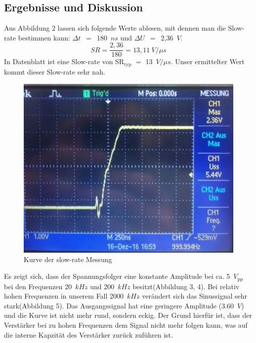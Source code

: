\subsection{Ergebnisse und Diskussion}
Aus Abbildung 2 lassen sich folgende Werte ablesen, mit dennen man die Slow-rate bestimmen kann: $\Delta t$~$=$~180~$ns$ und $\Delta U$~$=$~2,36~$V$. 
\begin{equation*}
SR = \frac{2,36}{180} = 13,11~V/\mu s
\end{equation*}
In Datenblatt ist eine Slow-rate von SR$_{\text{typ}}$ $=$ 13~$V/\mu s$. Unser ermittelter Wert kommt dieser Slow-rate sehr nah. 
\begin{figure}[!ht]
\begin{center}
\includegraphics[scale=0.6]{bild/slow-rate}
\caption{Kurve der slow-rate Messung}
\end{center}
\end{figure}
Es zeigt sich, dass der Spannungsfolger eine konstante Amplitude bei ca. 5~$V_{\text{pp}}$  bei den Frequenzen 20~$kHz$ und 200~$kHz$ besitzt(Abbildung 3, 4). Bei relativ hohen Frequenzen in unserem Fall 2000~$kHz$ ver\"andert sich das Sinussignal sehr stark(Abbildung 5). Das Ausgangssignal hat eine geringere Amplitude (3.60~$V$) und die Kurve ist nicht mehr rund, sondern eckig. Der Grund hierf\"ur ist, dass der Verst\"arker bei zu hohen Frequenzen dem Signal nicht mehr folgen kann, was auf die interne Kapzit\"at des Verst\"arker zur\"uck zuf\"uhren ist.
